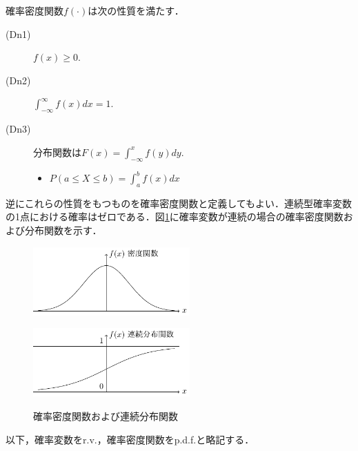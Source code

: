 \documentclass{jsreport}
\begin{document}
確率密度関数$f(\cdot)$は次の性質を満たす．
\begin{description}
  \item[(Dn1)] $f(x) \geq 0$.
  \item[(Dn2)] $\int_{-\infty}^{\infty} f(x) dx = 1$.
  \item[(Dn3)] 分布関数は$F(x) = \int_{-\infty}^x f(y) dy$.
  \begin{itemize}
    \item $P(a \leq X \leq b) = \int_{a}^b f(x) dx$
  \end{itemize}
\end{description}
逆にこれらの性質をもつものを確率密度関数と定義してもよい．連続型確率変数の1点における確率はゼロである．図\ref{fig:con}に確率変数が連続の場合の確率密度関数および分布関数を示す．
\begin{figure}[htb]
  \begin{minipage}[b]{0.5\linewidth}
    \centering
    \includegraphics[clip, width=6cm]{../figure/cpf.pdf}
    \label{fig:cpf}
  \end{minipage}
  \begin{minipage}[b]{0.5\linewidth}
    \centering
    \includegraphics[clip, width=6cm]{../figure/cpdf.pdf}
    \label{fig:cpdf}
  \end{minipage}
  \caption{確率密度関数および連続分布関数}\label{fig:con}
\end{figure}

以下，確率変数をr.v.，確率密度関数をp.d.f.と略記する．
\end{document}

